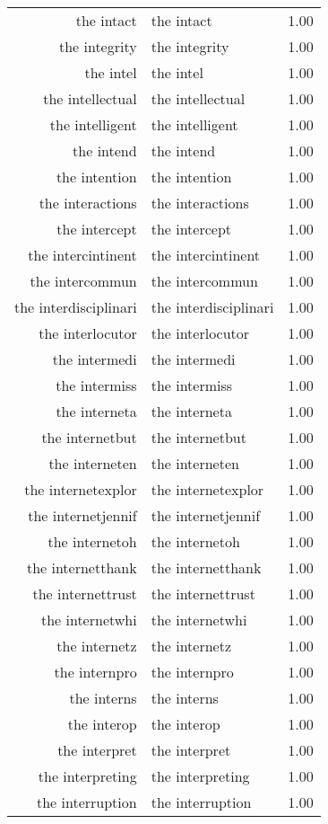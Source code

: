 \begin{table}[ht]
\begin{tabular}{rlr}
  the intact & the intact & 1.00 \\ 
  the integrity & the integrity & 1.00 \\ 
  the intel & the intel & 1.00 \\ 
  the intellectual & the intellectual & 1.00 \\ 
  the intelligent & the intelligent & 1.00 \\ 
  the intend & the intend & 1.00 \\ 
  the intention & the intention & 1.00 \\ 
  the interactions & the interactions & 1.00 \\ 
  the intercept & the intercept & 1.00 \\ 
  the intercintinent & the intercintinent & 1.00 \\ 
  the intercommun & the intercommun & 1.00 \\ 
  the interdisciplinari & the interdisciplinari & 1.00 \\ 
  the interlocutor & the interlocutor & 1.00 \\ 
  the intermedi & the intermedi & 1.00 \\ 
  the intermiss & the intermiss & 1.00 \\ 
  the interneta & the interneta & 1.00 \\ 
  the internetbut & the internetbut & 1.00 \\ 
  the interneten & the interneten & 1.00 \\ 
  the internetexplor & the internetexplor & 1.00 \\ 
  the internetjennif & the internetjennif & 1.00 \\ 
  the internetoh & the internetoh & 1.00 \\ 
  the internetthank & the internetthank & 1.00 \\ 
  the internettrust & the internettrust & 1.00 \\ 
  the internetwhi & the internetwhi & 1.00 \\ 
  the internetz & the internetz & 1.00 \\ 
  the internpro & the internpro & 1.00 \\ 
  the interns & the interns & 1.00 \\ 
  the interop & the interop & 1.00 \\ 
  the interpret & the interpret & 1.00 \\ 
  the interpreting & the interpreting & 1.00 \\ 
  the interruption & the interruption & 1.00 \\ 

\end{tabular}
\end{table}
